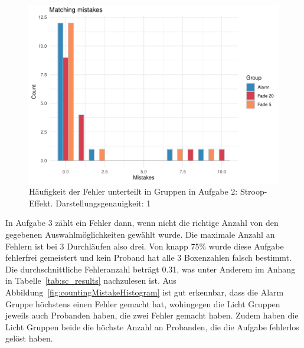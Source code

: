 
\begin{figure}[H]
	\centering
	\includegraphics[width=\textwidth]{./_StudyResults/matchingMisHist}
	\caption{Häufigkeit der Fehler unterteilt in Gruppen in Aufgabe 2: Stroop-Effekt. Darstellungsgenauigkeit: 1}
	\label{fig:matchingMistakeHistogram}
\end{figure}

In Aufgabe 3 zählt ein Fehler dann, wenn nicht die richtige Anzahl von den gegebenen Auswahlmöglichkeiten gewählt wurde. Die maximale Anzahl an Fehlern ist bei 3 Durchläufen also drei.
Von knapp 75\% wurde diese Aufgabe fehlerfrei gemeistert und kein Proband hat alle 3 Boxenzahlen falsch bestimmt. Die durchschnittliche Fehleranzahl beträgt 0.31, was unter Anderem im Anhang in Tabelle~\ref{tab:sc_results} nachzulesen ist.
Aus Abbildung~\ref{fig:countingMistakeHistogram} ist gut erkennbar, dass die Alarm Gruppe höchstens einen Fehler gemacht hat, wohingegen die Licht Gruppen jeweils auch Probanden haben, die zwei Fehler gemacht haben. Zudem haben die Licht Gruppen beide die höchste Anzahl an Probanden, die die Aufgabe fehlerlos gelöst haben.

